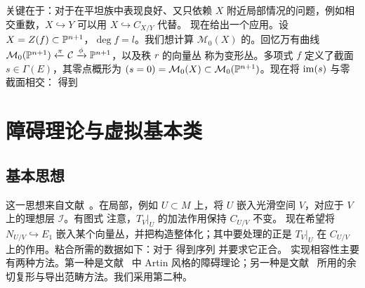 关键在于：对于在平坦族中表现良好、又只依赖 $X$ 附近局部情况的问题，例如相交重数，$X\hookrightarrow Y$ 可以用 $X\hookrightarrow C_{X/Y}$ 代替。
现在给出一个应用。设 $X=Z(f)\subset\mathbb P^{n+1}$，$\deg f=l$。我们想计算 $\mathcal M_0(X)$ 的。回忆万有曲线
$\mathcal M_0(\mathbb P^{n+1})\xleftarrow{\pi}\mathcal C\xrightarrow{\phi}\mathbb P^{n+1}$，以及秩 $r$ 的向量丛
称为变形丛。多项式 $f$ 定义了截面 $s\in\Gamma(E)$，其零点概形为 $(s=0)=\mathcal M_0(X)\subset\mathcal M_0(\mathbb P^{n+1})$。现在将 $\operatorname{im}(s)$ 与零截面相交：
得到
\section{障碍理论与虚拟基本类}
\subsection{基本思想}
这一思想来自文献~\cite{ref21}。在局部，例如 $U\subset M$ 上，将 $U$ 嵌入光滑空间 $V$，对应于 $V$ 上的理想层 $\mathcal I$。有图式
注意，$T_V|_U$ 的加法作用保持 $C_{U/V}$ 不变。
现在希望将 $N_{U/V}\hookrightarrow E_1$ 嵌入某个向量丛，并把构造整体化；其中要处理的正是 $T_V|_U$ 在 $C_{U/V}$ 上的作用。粘合所需的数据如下：对于
得到序列
并要求它正合。
实现相容性主要有两种方法。第一种是文献~\cite{ref21} 中 Artin 风格的障碍理论；另一种是文献~\cite{ref3} 所用的余切复形与导出范畴方法。我们采用第二种。
